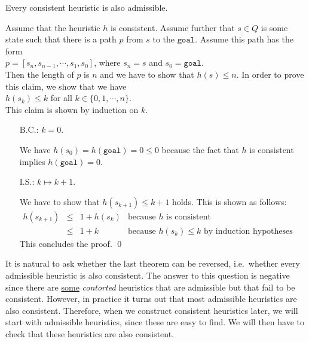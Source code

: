 \begin{Theorem}
  Every consistent heuristic is also admissible. 
\end{Theorem}

\proof
Assume that the heuristic $h$ is consistent.  Assume further that $s \in Q$ is some state such that there is a
path $p$ from $s$ to the $\mathtt{goal}$.  Assume this path has the form
\\[0.2cm]
\hspace*{1.3cm}
$p = [s_n, s_{n-1}, \cdots, s_1, s_0]$, \quad where $s_n = s$ and $s_0 = \mathtt{goal}$.
\\[0.2cm]
Then the length of $p$ is $n$ and we have to show that $h(s) \leq n$.  In order to prove this claim, we show
that we have
\\[0.2cm]
\hspace*{1.3cm}
$h(s_k) \leq k$ \quad for all $k \in \{0, 1, \cdots, n\}$.
\\[0.2cm]
This claim is shown by induction on $k$.
\begin{enumerate}
\item[B.C.:] $k=0$.

             We have $h(s_0) = h(\mathtt{goal}) = 0 \leq 0$ because the fact that $h$ is consistent implies 
             $h(\mathtt{goal}) = 0$. 
\item[I.S.:] $k \mapsto k+1$.
  
             We have to show that $h(s_{k+1}) \leq k + 1$ holds.  This is shown as follows:
             \\[0.2cm]
             \hspace*{1.3cm}
             $
             \begin{array}{lcll}
               h(s_{k+1}) & \leq & 1 + h(s_k) & \mbox{because $h$ is consistent} \\[0.2cm]
                         & \leq & 1 + k      & \mbox{because $h(s_k) \leq k$ by induction hypotheses}
             \end{array}
             $
             \\[0.2cm]
             This concludes the proof.  \qed
\end{enumerate}

It is natural to ask whether the last theorem can be reversed, i.e.~whether every admissible heuristic is also
consistent.  The answer to this question is negative since there are
\href{http://web.cs.du.edu/~sturtevant/papers/incnew.pdf}{some} \emph{\color{red}contorted}
heuristics that are admissible but that fail to be consistent.  However, in practice it turns out that most 
admissible heuristics are also consistent.  Therefore, when we construct consistent heuristics later, we will
start with admissible heuristics, since these are easy to find.  We will then have to check that these 
heuristics are also consistent.  

